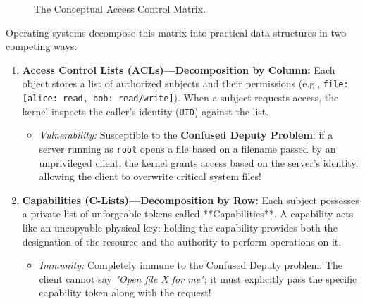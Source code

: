 \begin{figure}[htbp]
\centering
{}
\caption{The Conceptual Access Control Matrix.}
\label{fig:access_matrix}
\end{figure}

Operating systems decompose this matrix into practical data structures in two competing ways:
\begin{enumerate}
    \item \textbf{Access Control Lists (ACLs)---Decomposition by Column:} Each object stores a list of authorized subjects and their permissions (e.g., \texttt{file: [alice: read, bob: read/write]}). When a subject requests access, the kernel inspects the caller's identity (\texttt{UID}) against the list.
    \begin{itemize}
        \item \textit{Vulnerability:} Susceptible to the \textbf{Confused Deputy Problem}: if a server running as \texttt{root} opens a file based on a filename passed by an unprivileged client, the kernel grants access based on the server's identity, allowing the client to overwrite critical system files!
    \end{itemize}
    \item \textbf{Capabilities (C-Lists)---Decomposition by Row:} Each subject possesses a private list of unforgeable tokens called **Capabilities**. A capability acts like an uncopyable physical key: holding the capability provides both the designation of the resource and the authority to perform operations on it.
    \begin{itemize}
        \item \textit{Immunity:} Completely immune to the Confused Deputy problem. The client cannot say \textit{"Open file X for me"}; it must explicitly pass the specific capability token along with the request!
    \end{itemize}
\end{enumerate}

